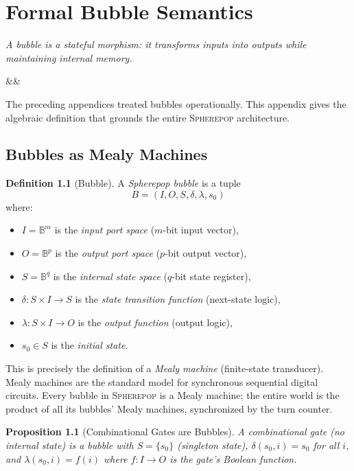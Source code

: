 \documentclass[11pt,a4paper,openany]{book}
\theoremstyle{plain}
\newtheorem{proposition}[theorem]{Proposition}
\theoremstyle{definition}
\newtheorem{definition}[theorem]{Definition}
\theoremstyle{remark}
\newcommand{\Sp}{\textsc{Spherepop}\xspace}
\newcommand{\chapterquote}[2]{%
  \par\vspace{0.8em}%
  \begin{flushright}%
    \begin{minipage}{0.65\textwidth}%
      {\itshape #1\par}%
      \ifx&#2&\else\vspace{0.3em}{\raggedleft\small--- #2\par}\fi%
    \end{minipage}%
  \end{flushright}%
  \vspace{0.8em}\par\noindent}
\begin{document}
\chapter{Formal Bubble Semantics}
\label{app:bubble-semantics}

\chapterquote{%
  A bubble is a stateful morphism: it transforms inputs into outputs
  while maintaining internal memory.
}{}

The preceding appendices treated bubbles operationally. This appendix
gives the algebraic definition that grounds the entire \Sp{} architecture.

\section{Bubbles as Mealy Machines}

\begin{definition}[Bubble]
  A \emph{Spherepop bubble} is a tuple
  \[
    B = (I, O, S, \delta, \lambda, s_0)
  \]
  where:
  \begin{itemize}
    \item $I = \mathbb{B}^m$ is the \emph{input port space} ($m$-bit input vector),
    \item $O = \mathbb{B}^p$ is the \emph{output port space} ($p$-bit output vector),
    \item $S = \mathbb{B}^q$ is the \emph{internal state space} ($q$-bit state register),
    \item $\delta : S \times I \to S$ is the \emph{state transition function}
          (next-state logic),
    \item $\lambda : S \times I \to O$ is the \emph{output function}
          (output logic),
    \item $s_0 \in S$ is the \emph{initial state}.
  \end{itemize}
\end{definition}

This is precisely the definition of a \emph{Mealy machine} (finite-state
transducer). Mealy machines are the standard model for synchronous
sequential digital circuits. Every bubble in \Sp{} is a Mealy machine;
the entire world is the product of all its bubbles' Mealy machines,
synchronized by the turn counter.

\begin{proposition}[Combinational Gates are Bubbles]
  A combinational gate (no internal state) is a bubble with $S = \{s_0\}$
  (singleton state), $\delta(s_0, i) = s_0$ for all $i$, and
  $\lambda(s_0, i) = f(i)$ where $f : I \to O$ is the gate's Boolean function.
\end{proposition}
\end{document}
